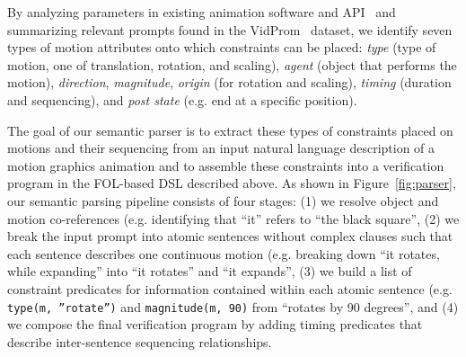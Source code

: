 
By analyzing parameters in existing animation software and
API~\cite{TODO} and summarizing relevant prompts found in the
VidProm~\cite{wang2024vidprom} dataset, we identify seven types of
motion attributes onto which constraints can be placed: \textit{type}
(type of motion, one of translation, rotation, and scaling),
\textit{agent} (object that performs the motion), \textit{direction},
\textit{magnitude}, \textit{origin} (for rotation and scaling),
\textit{timing} (duration and sequencing), and \textit{post state}
(e.g. end at a specific position).

The goal of our semantic parser is to extract these types of
constraints placed on motions and their sequencing from an input
natural language description of a motion graphics animation and to
assemble these constraints into a verification program in the
FOL-based DSL described above.
%
%
As shown in Figure~\ref{fig:parser}, our semantic parsing pipeline
consists of four stages: (1) we resolve object and motion
co-references (e.g. identifying that ``it'' refers to ``the black
square'', (2) we break the input prompt into atomic sentences
without complex clauses such that each sentence describes one
continuous motion (e.g. breaking down ``it rotates, while expanding''
into ``it rotates'' and ``it expands'', (3) we build a list of
constraint predicates for information contained within each atomic
sentence (e.g. \texttt{type(m, ''rotate'')} and \texttt{magnitude(m,
  90)} from ``rotates by 90 degrees'', and (4) we compose the final
verification program by adding timing predicates that describe
inter-sentence sequencing relationships.

